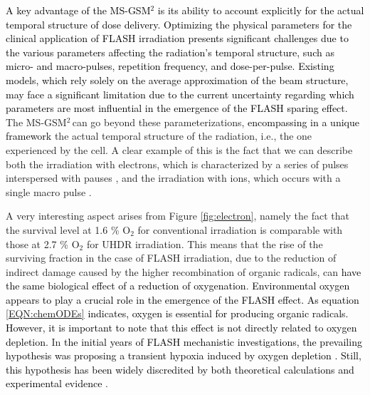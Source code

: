 \documentclass[10pt]{iopart}
\newcommand{\gsm}{MS-GSM$^2\,$}
\newcommand{\fra}[1]{\textcolor{black}{#1}}
\newcommand{\ema}[1]{\textcolor{black}{#1}}
\numberwithin{table}{section}
\begin{document}
\fra{A key advantage of the MS-GSM$^2$ is its ability to account \ema{explicitly} for the actual temporal structure of dose delivery. Optimizing the physical parameters for the clinical application of FLASH irradiation presents significant challenges due to the various parameters affecting the radiation's temporal structure, such as micro- and macro-pulses, repetition frequency, and dose-per-pulse. Existing models, which rely solely on the average approximation of the beam structure, may face a significant limitation due to the current uncertainty regarding which parameters are most influential in the emergence of the FLASH sparing effect.} The \gsm can go beyond these parameterizations, \fra{encompassing in a unique framework} the actual temporal structure of the radiation, i.e., the one experienced by the cell. A clear example of this is the fact that we can describe both the irradiation with electrons, which is characterized by a series of pulses interspersed with pauses \cite{Adrian2020}, and the irradiation with ions, which occurs with a single macro pulse \cite{Tessonnier2021, Tinganelliinvitro2022}.

A very interesting aspect arises from Figure \ref{fig:electron}, namely the fact that the survival level at 1.6 \% $\mathrm{O_2}$ for conventional irradiation is comparable with those at 2.7 \% $\mathrm{O_2}$ for UHDR irradiation. This means that the rise of the surviving fraction in the case of FLASH irradiation, due to the reduction of indirect damage caused by the higher recombination of organic radicals, can \fra{have the same biological effect of a reduction of oxygenation}. \fra{Environmental oxygen appears to play a crucial role in the emergence of the FLASH effect. As equation \eqref{EQN:chemODEs} indicates, oxygen is essential for producing organic radicals. However, it is important to note that this effect is not directly related to oxygen depletion.} In \ema{the initial years of FLASH mechanistic investigations, the prevailing hypothesis was proposing a transient hypoxia induced by oxygen depletion \cite{petersson2020quantitative}. Still, this hypothesis has been widely discredited by both theoretical calculations \cite{Boscolo2021} and experimental evidence \cite{jansen2021does, cao2021quantification}}.
\end{document}

